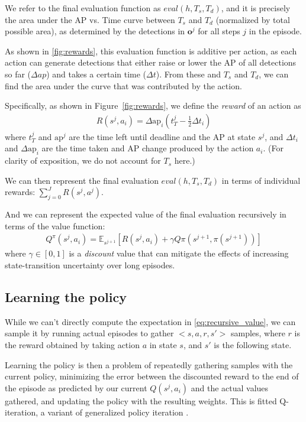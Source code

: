 We refer to the final evaluation function as $eval(h,T_s,T_d)$, and it is precisely the area under the AP vs. Time curve between $T_s$ and $T_d$ (normalized by total possible area), as determined by the detections in $\mathbf{o}^j$ for all steps $j$ in the episode.

As shown in \autoref{fig:rewards}, this evaluation function is additive per action, as each action can generate detections that either raise or lower the AP of all detections so far ($\Delta ap$) and takes a certain time ($\Delta t$).
From these and $T_s$ and $T_d$, we can find the area under the curve that was contributed by the action.

Specifically, as shown in Figure~\ref{fig:rewards}, we define the \emph{reward} of an action as
\begin{align}\label{eq:advanced}
R(s^j,a_i) = \Delta \text{ap}_i (t_T^j-\frac{1}{2}\Delta t_i)
\end{align}
where $t_T^j$ and $\text{ap}^j$ are the time left until deadline and the AP at state $s^j$, and $\Delta t_i$ and $\Delta \text{ap}_i$ are the time taken and AP change produced by the action $a_i$.
(For clarity of exposition, we do not account for $T_s$ here.)

We can then represent the final evaluation $eval(h,T_s,T_d)$ in terms of individual rewards: $\sum_{j=0}^J R(s^j,a^j)$.

And we can represent the expected value of the final evaluation recursively in terms of the value function:
\begin{align} \label{eq:recursive_value}
Q^\pi(s^j,a_i) = \mathbb{E}_{s^{j+1}} [R(s^j,a_i) + \gamma Q\pi(s^{j+1},\pi(s^{j+1}))]
\end{align}
where $\gamma \in [0,1]$ is a \emph{discount} value that can mitigate the effects of increasing state-transition uncertainty over long episodes.

\subsection{Learning the policy}
While we can't directly compute the expectation in \eqref{eq:recursive_value}, we can sample it by running actual episodes to gather $<s,a,r,s'>$ samples, where $r$ is the reward obtained by taking action $a$ in state $s$, and $s'$ is the following state.

Learning the policy is then a problem of repeatedly gathering samples with the current policy, minimizing the error between the discounted reward to the end of the episode as predicted by our current $Q(s^j,a_i)$ and the actual values gathered, and updating the policy with the resulting weights.
This is fitted Q-iteration, a variant of generalized policy iteration \cite{Ernst2005,Sutton1998}.

